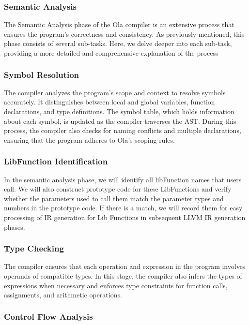 
\subsubsection{Semantic Analysis}

The Semantic Analysis phase of the Ola compiler is an extensive process that ensures the program's correctness and consistency. As previously mentioned, this phase consists of several sub-tasks. Here, we delve deeper into each sub-task, providing a more detailed and comprehensive explanation of the process

\subsubsection*{Symbol Resolution}

The compiler analyzes the program's scope and context to resolve symbols accurately. It distinguishes between local and global variables, function declarations, and type definitions. The symbol table, which holds information about each symbol, is updated as the compiler traverses the AST. During this process, the compiler also checks for naming conflicts and multiple declarations, ensuring that the program adheres to Ola's scoping rules.

\subsubsection*{LibFunction Identification}

In the semantic analysis phase, we will identify all libFunction names that users call. We will also construct prototype code for these LibFunctions and verify whether the parameters used to call them match the parameter types and numbers in the prototype code. If there is a match, we will record them for easy processing of IR generation for Lib Functions in subsequent LLVM IR generation phases.

\subsubsection*{Type Checking}

The compiler ensures that each operation and expression in the program involves operands of compatible types. In this stage, the compiler also infers the types of expressions when necessary and enforces type constraints for function calls, assignments, and arithmetic operations.

\subsubsection*{Control Flow Analysis}

